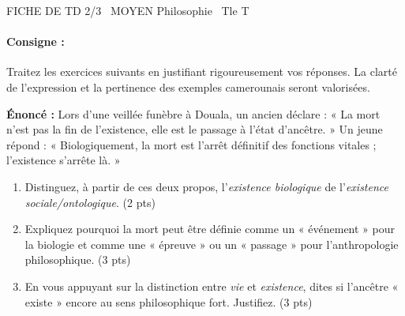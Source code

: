 \documentclass[11pt]{article}
\begin{document}
\begin{tcolorbox}[enhanced,colback=popink,colframe=popink,arc=10pt,boxrule=0pt,left=12pt,right=12pt,top=9pt,bottom=9pt]
{\color{white}\popxbold\small FICHE DE TD 2/3 \textbullet\ MOYEN \hfill Philosophie \textbullet\ Tle T\par}
\end{tcolorbox}
\vspace{4pt}
\paragraph{Consigne :} Traitez les exercices suivants en justifiant rigoureusement vos réponses. La clarté de l'expression et la pertinence des exemples camerounais seront valorisées.

\begin{exercice}
\textbf{Énoncé :} Lors d'une veillée funèbre à Douala, un ancien déclare : « La mort n'est pas la fin de l'existence, elle est le passage à l'état d'ancêtre. » Un jeune répond : « Biologiquement, la mort est l'arrêt définitif des fonctions vitales ; l'existence s'arrête là. »
\begin{enumerate}
    \item Distinguez, à partir de ces deux propos, l'\textit{existence biologique} de l'\textit{existence sociale/ontologique}. (2 pts)
    \item Expliquez pourquoi la mort peut être définie comme un « événement » pour la biologie et comme une « épreuve » ou un « passage » pour l'anthropologie philosophique. (3 pts)
    \item En vous appuyant sur la distinction entre \textit{vie} et \textit{existence}, dites si l'ancêtre « existe » encore au sens philosophique fort. Justifiez. (3 pts)
\end{enumerate}
\end{exercice}
\end{document}
